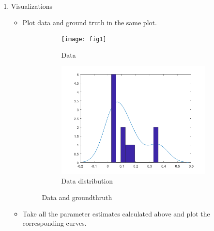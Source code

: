 \documentclass[11pt,a4paper]{article}
\begin{document}
\begin{enumerate}
\begin{itemize}
\end{itemize}
\item Visualizations
\begin{itemize}
	\item Plot data and ground truth in the same plot.
\begin{figure}[H]
	\centering
	\begin{subfigure}{0.49\textwidth}
		\texttt{[image: fig1]}
		\caption{Data}
		\label{fig4:first}
	\end{subfigure}
	\begin{subfigure}{0.49\textwidth}
		\includegraphics[width=\textwidth]{fig2}
		\caption{Data distribution}
		\label{fig4:first}
	\end{subfigure}
\caption{Data and groundthruth}
\end{figure}
\item Take all the parameter estimates calculated above and plot the corresponding curves. 


\end{itemize}
\end{enumerate}
\end{document}
